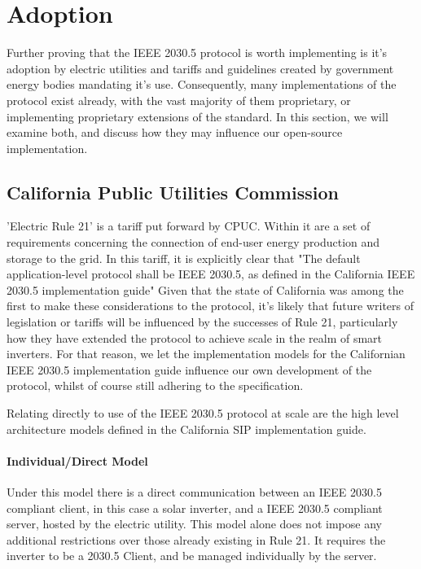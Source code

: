 \chapter{Adoption}\label{ch:adoption}

Further proving that the IEEE 2030.5 protocol is worth implementing is it's adoption by electric utilities and tariffs and guidelines created by government energy bodies mandating it's use.
Consequently, many implementations of the protocol exist already, with the vast majority of them proprietary, or implementing proprietary extensions of the standard.
In this section, we will examine both, and discuss how they may influence our open-source implementation. 

\section{California Public Utilities Commission}
'Electric Rule 21' is a tariff put forward by CPUC. Within it are a set of requirements concerning the connection of end-user energy production and storage to the grid. In this tariff, it is explicitly clear that
"The default application-level protocol shall be IEEE 2030.5, as defined in the California IEEE 2030.5 implementation guide" \cite[]{Rule21}
Given that the state of California was among the first to make these considerations to the protocol, it's likely that future writers of legislation or tariffs will be influenced by the successes of Rule 21, particularly how they have extended the protocol to achieve scale in the realm of smart inverters.
For that reason, we let the implementation models for the Californian IEEE 2030.5 implementation guide influence our own development of the protocol, whilst of course still adhering to the specification.

Relating directly to use of the IEEE 2030.5 protocol at scale are the high level architecture models defined in the California SIP implementation guide.

\subsubsection{Individual/Direct Model}
Under this model there is a direct communication between an IEEE 2030.5 compliant client, in this case a solar inverter, and a IEEE 2030.5 compliant server, hosted by the electric utility.
This model alone does not impose any additional restrictions over those already existing in Rule 21. It requires the inverter to be a 2030.5 Client, and be managed individually by the server.

